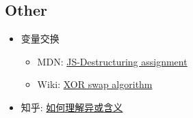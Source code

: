 \documentclass{article}
\begin{document}
\subsection{Other}

    \begin{itemize}
        \item 变量交换
        \begin{itemize}
            \item MDN: \href{https://developer.mozilla.org/en-US/docs/Web/JavaScript/Reference/Operators/Destructuring_assignment}{JS-Destructuring assignment}
            \item Wiki: \href{https://en.wikipedia.org/wiki/XOR_swap_algorithm}{XOR swap algorithm}
        \end{itemize}
        \item 知乎: \href{https://www.zhihu.com/question/31116687/answer/964367526}{如何理解异或含义}
    \end{itemize}
\end{document}
